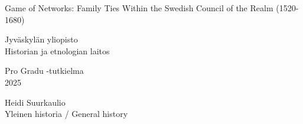 \begin{center}
	\pagestyle{empty}
	\vspace*{\fill}
	\Huge{Game of Networks: Family Ties Within the Swedish Council of the Realm (1520-1680)}
	
	\vspace{2cm}
	
	\LARGE{Jyväskylän yliopisto}\\

	\LARGE{Historian ja etnologian laitos}\\
	
	\vspace{0.25cm}
	
	\LARGE{Pro Gradu -tutkielma}\\

	\LARGE{2025}

	
	
	\vspace*{\fill}
\end{center}

\begin{minipage}{\linewidth}
	\begin{flushright}
		Heidi Suurkaulio\\
		Yleinen historia / General history
	\end{flushright}
\end{minipage}